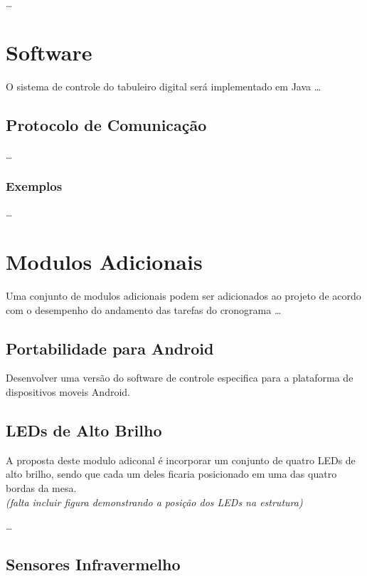 \documentclass[a4paper,10pt]{article}
\begin{document}
\ldots

\section{Software}

O sistema de controle do tabuleiro digital será implementado em Java \ldots \\

\subsection{Protocolo de Comunicação}

\ldots

\subsubsection{Exemplos}

\ldots

\section{Modulos Adicionais}

Uma conjunto de modulos adicionais podem ser adicionados ao projeto de acordo com o desempenho do andamento das tarefas do cronograma \ldots

\subsection{Portabilidade para Android}

Desenvolver uma versão do software de controle especifica para a plataforma de
dispositivos moveis Android. 

\subsection{LEDs de Alto Brilho}

A proposta deste modulo adiconal é incorporar um conjunto de quatro LEDs de alto brilho, sendo que cada um deles ficaria posicionado em uma das quatro bordas da mesa. \\

{\it (falta incluir figura demonstrando a posição dos LEDs na estrutura)}

\ldots

\subsection{Sensores Infravermelho}
\end{document}
